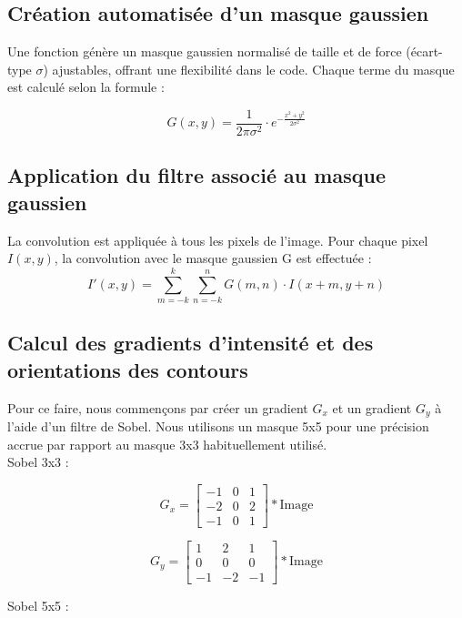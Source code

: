 \subsection{Création automatisée d'un masque gaussien}

Une fonction génère un masque gaussien normalisé de taille et de force (écart-type $\sigma$) ajustables, offrant une flexibilité dans le code. Chaque terme du masque est calculé selon la formule :

\[
G(x,y) = \frac{1}{2\pi\sigma^2} \cdot e^{-\frac{x^2+y^2}{2\sigma^2}}
\]

\subsection{Application du filtre associé au masque gaussien}

La convolution est appliquée à tous les pixels de l'image. Pour chaque pixel $I(x,y)$, la convolution avec le masque gaussien G est effectuée :\\

\[
I'(x,y) = \sum_{m=-k}^k \sum_{n=-k}^n G(m,n) \cdot I(x+m,y+n)
\]


\subsection{Calcul des gradients d'intensité et des orientations des contours}

Pour ce faire, nous commençons par créer un gradient $G_x$ et un gradient $G_y$ à l'aide d'un filtre de Sobel. Nous utilisons un masque 5x5 pour une précision accrue par rapport au masque 3x3 habituellement utilisé.\\

Sobel 3x3 :

\[G_x = \begin{bmatrix} -1 & 0 & 1 \\ -2 & 0 & 2 \\ -1 & 0 & 1 \end{bmatrix} * \text{Image}\]

\[G_y = \begin{bmatrix} 1 & 2 & 1 \\ 0 & 0 & 0 \\ -1 & -2 & -1 \end{bmatrix} * \text{Image}\]

Sobel 5x5 :


